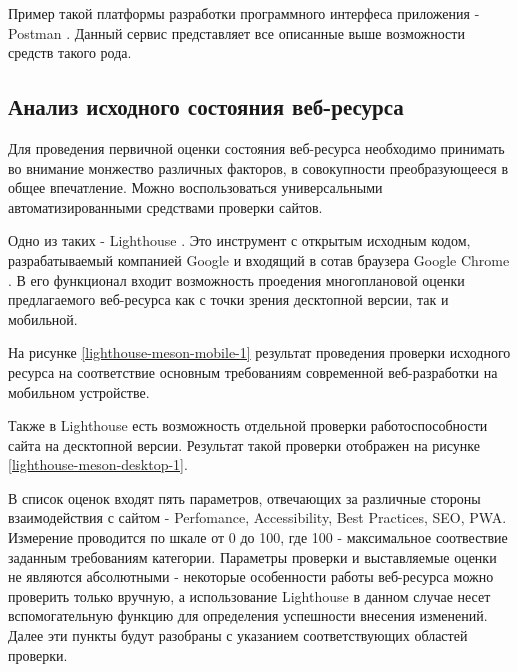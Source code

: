 Пример такой платформы разработки программного интерфеса приложения - Postman \cite{postman}.
Данный сервис представляет все описанные выше возможности средств такого рода.

\subsection{Анализ исходного состояния веб-ресурса}

Для проведения первичной оценки состояния веб-ресурса необходимо принимать во внимание монжество различных факторов, в совокупности преобразующееся в общее впечатление.
Можно воспользоваться универсальными автоматизированными средствами проверки сайтов.

Одно из таких - Lighthouse \cite{lighthouse}.
Это инструмент с открытым исходным кодом, разрабатываемый компанией Google \cite{google} и входящий в сотав браузера Google Chrome \cite{chrome}.
В его функционал входит возможность проедения многоплановой оценки предлагаемого веб-ресурса как с точки зрения десктопной версии, так и мобильной.

На рисунке \ref{lighthouse-meson-mobile-1} результат проведения проверки исходного ресурса на соответствие основным требованиям современной веб-разработки на мобильном устройстве.


Также в Lighthouse есть возможность отдельной проверки работоспособности сайта на десктопной версии.
Результат такой проверки отображен на рисунке \ref{lighthouse-meson-desktop-1}.


В список оценок входят пять параметров, отвечающих за различные стороны взаимодействия с сайтом - Perfomance, Accessibility, Best Practices, SEO, PWA.
Измерение проводится по шкале от 0 до 100, где 100 - максимальное соотвествие заданным требованиям категории.
Параметры проверки и выставляемые оценки не являются абсолютными - некоторые особенности работы веб-ресурса можно проверить только вручную, а использование Lighthouse в данном случае несет вспомогательную функцию для определения успешности внесения изменений.
Далее эти пункты будут разобраны с указанием соответствующих областей проверки.

